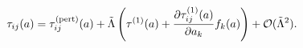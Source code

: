 \begin{equation}
\tau _{ij}(a)=\tau _{ij}^{({\rm {pert})}}(a)+\tilde{\Lambda}\left( \tau
^{(1)}(a)+\frac{\partial \tau _{ij}^{(1)}(a)}{\partial a_{k}}f_{k}(a)\right)
+{\cal O}(\tilde{\Lambda}^{2}).
\end{equation}


